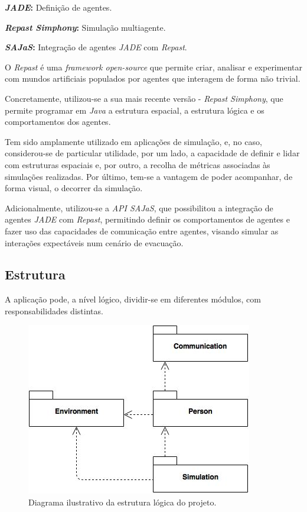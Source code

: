 \documentclass[12pt]{article}
\begin{document}
\begin{titlepage}
\textbf{\textit{JADE}:} Definição de agentes.

\textbf{\textit{Repast Simphony}:} Simulação multiagente.

\textbf{\textit{SAJaS}:} Integração de agentes \textit{JADE} com \textit{Repast}.
\newline

O \textit{Repast} é uma \textit{framework open-source} que permite criar, analisar e experimentar com mundos artificiais populados por agentes que interagem de forma não trivial.

Concretamente, utilizou-se a sua mais recente versão - \textit{Repast Simphony}, que permite programar em \textit{Java} a estrutura espacial, a estrutura lógica e os comportamentos dos agentes.

Tem sido amplamente utilizado em aplicações de simulação, e, no caso, considerou-se de particular utilidade, por um lado, a capacidade de definir e lidar com estruturas espaciais e, por outro, a recolha de métricas associadas às simulações realizadas. Por último, tem-se a vantagem de poder acompanhar, de forma visual, o decorrer da simulação.

Adicionalmente, utilizou-se a \textit{API SAJaS}, que possibilitou a integração de agentes \textit{JADE} com \textit{Repast}, permitindo definir os comportamentos de agentes e fazer uso das capacidades de comunicação entre agentes, visando simular as interações expectáveis num cenário de evacuação.

\subsection{Estrutura}

A aplicação pode, a nível lógico, dividir-se em diferentes módulos, com responsabilidades distintas.
\begin{figure}[H]
	\centering
	\includegraphics[scale=0.8]{packages.jpg}
	\caption{Diagrama ilustrativo da estrutura lógica do projeto.}
	\label{uml}
\end{figure}


\end{titlepage}
\end{document}
